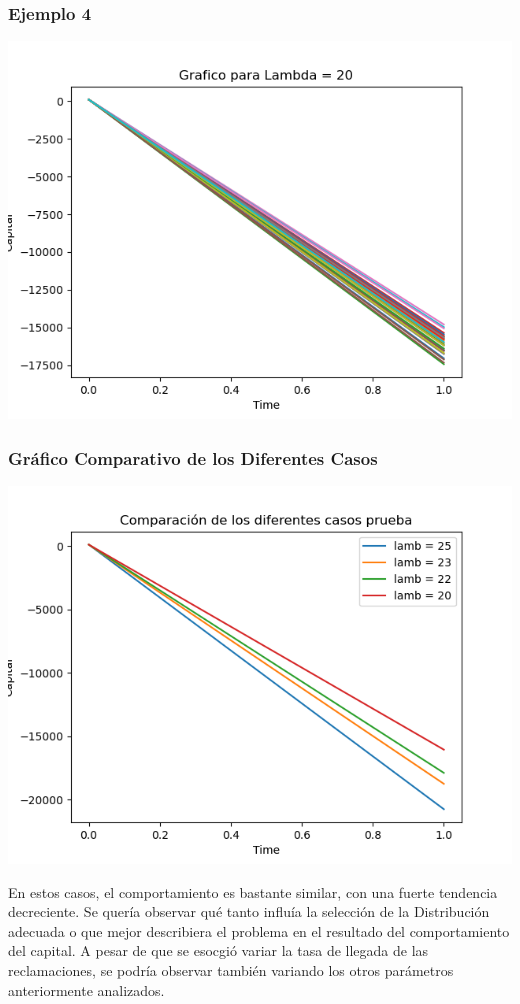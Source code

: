 \documentclass{article}
\begin{document}
\subsubsection{Ejemplo 4}
\includegraphics[scale = 0.8]{dis4.png}

\subsubsection{Gráfico Comparativo de los Diferentes Casos}
\includegraphics[scale = 0.8]{dicomp.png}

En estos casos, el comportamiento es bastante similar, con una fuerte tendencia decreciente. Se quería observar qué tanto influía la selección de la Distribución adecuada o que mejor describiera el problema en el resultado del comportamiento del capital.
A pesar de que se esocgió variar la tasa de llegada de las reclamaciones, se podría observar también variando los otros parámetros anteriormente analizados. 
\end{document}
